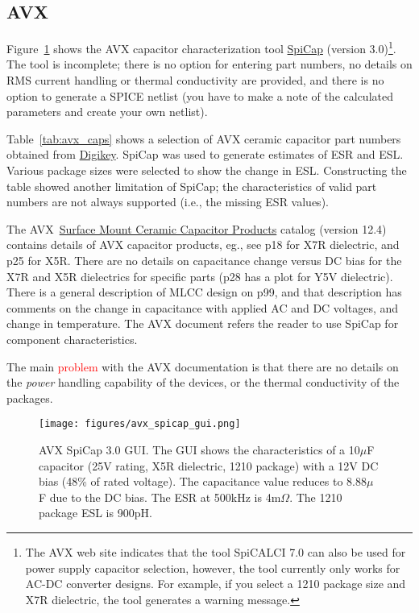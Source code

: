 \documentclass[10pt,twoside]{article}
\begin{document}
\clearpage
\subsection{AVX}

Figure~\ref{fig:avx_spicap_gui} shows the AVX capacitor characterization
tool \href{http://www.avx.com/SpiApps/default.asp}{SpiCap}
(version 3.0)\footnote{The AVX web site indicates that the tool
SpiCALCI 7.0 can also be used for power supply capacitor selection,
however, the tool currently only works for AC-DC converter designs.
For example, if you select a 1210 package size and X7R dielectric,
the tool generates a warning message.}. The tool is incomplete;
there is no option for entering part numbers, no details on
RMS current handling or thermal conductivity are provided,
and there is no option to generate a SPICE netlist (you have to
make a note of the calculated parameters and create your own netlist).

Table~\ref{tab:avx_caps} shows a selection of AVX ceramic capacitor
part numbers obtained from \href{http://www.digikey.com}{Digikey}.
SpiCap was used to generate estimates of ESR and ESL. Various
package sizes were selected to show the change in ESL.
Constructing the table showed another limitation of SpiCap;
the characteristics of valid part numbers are not always
supported (i.e., the missing ESR values).

The AVX~\href{http://www.avx.com/docs/masterpubs/smccp.pdf}
{Surface Mount Ceramic Capacitor Products} catalog  (version 12.4)
contains details of AVX capacitor products, eg., 
see p18 for X7R dielectric, and p25 for X5R. There are no
details on capacitance change versus DC bias for the X7R and
X5R dielectrics for specific parts (p28 has a plot for Y5V dielectric).
There is a general description of MLCC design on p99, and that
description has comments on the change in capacitance
with applied AC and DC voltages, and change in temperature.
The AVX document refers the reader to use SpiCap for component
characteristics.

The main \textcolor{red}{problem} with the AVX documentation is that
there are no details on the {\em power} handling 
capability of the devices, or the thermal conductivity of the packages.

\clearpage
%
\begin{figure}[p]
  \begin{center}
    \texttt{[image: figures/avx\_spicap\_gui.png]}\\
  \end{center}
  \caption{AVX SpiCap 3.0 GUI.
  The GUI shows the characteristics of a 10$\mu$F capacitor
  (25V rating, X5R dielectric, 1210 package) with a 12V DC bias
  (48\% of rated voltage). The capacitance value reduces to
  8.88$\mu$F due to the DC bias. The ESR at 500kHz is 4m$\Omega$.
  The 1210 package ESL is 900pH.}
  \label{fig:avx_spicap_gui}
\end{figure}
\end{document}
